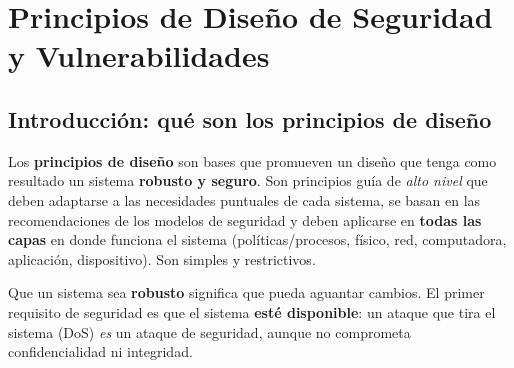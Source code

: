 \documentclass[../main.tex]{subfiles}
\begin{document}
\shorthandoff{<>}
\section{Principios de Diseño de Seguridad y Vulnerabilidades}

\subsection{Introducción: qué son los principios de diseño}

Los \textbf{principios de diseño} son bases que promueven un diseño que tenga como resultado un sistema \textbf{robusto y seguro}. Son principios guía de \emph{alto nivel} que deben adaptarse a las necesidades puntuales de cada sistema, se basan en las recomendaciones de los modelos de seguridad y deben aplicarse en \textbf{todas las capas} en donde funciona el sistema (políticas/procesos, físico, red, computadora, aplicación, dispositivo). Son simples y restrictivos.

\begin{center}
\end{center}

\begin{destacado}
Que un sistema sea \textbf{robusto} significa que pueda aguantar cambios. El primer requisito de seguridad es que el sistema \textbf{esté disponible}: un ataque que tira el sistema (DoS) \emph{es} un ataque de seguridad, aunque no comprometa confidencialidad ni integridad.
\end{destacado}
\end{document}
